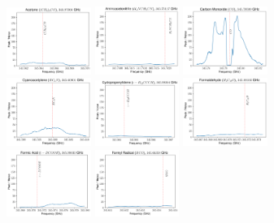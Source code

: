 \documentclass[12pt]{article}
\begin{document}
\begin{figure}
\includegraphics[width=0.245\textwidth]{spw3_(CH3)2CO}
\includegraphics[width=0.245\textwidth]{spw3_H2NCH2CN}
\includegraphics[width=0.245\textwidth]{spw3_CO}
\includegraphics[width=0.245\textwidth]{spw3_HC3N}
\includegraphics[width=0.245\textwidth]{spw3_c-H13CCCH}
\includegraphics[width=0.245\textwidth]{spw3_H2C18O}
\includegraphics[width=0.245\textwidth]{spw3_t-DCOOH}
\includegraphics[width=0.245\textwidth]{spw3_HCO}

\end{figure}
\end{document}
